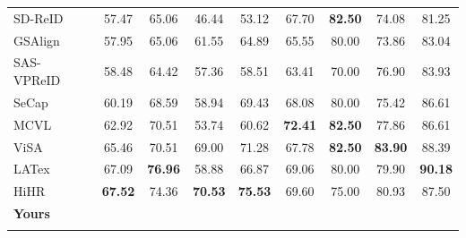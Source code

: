 \documentclass[runningheads]{llncs}
\makeatletter
\let\leaderboards@table\table
\let\leaderboards@endtable\endtable
\renewenvironment{table}[1][]{\leaderboards@table[H]}{\leaderboards@endtable}
\makeatother
\begin{document}
\begin{table}[t]
\begin{tabular}{lcccccccc}
    SD-ReID~\cite{wang2026sd}          & 57.47                               & 65.06                  & 46.44                   & 53.12                  & 67.70                   & \textbf{82.50}         & 74.08                   & 81.25                  \\
    GSAlign~\cite{li2026gsalign}       & 57.95                               & 65.06                  & 61.55                   & 64.89                  & 65.55                   & 80.00                  & 73.86                   & 83.04                  \\
    SAS-VPReID~\cite{yang2026sas}      & 58.48                               & 64.42                  & 57.36                   & 58.51                  & 63.41                   & 70.00                  & 76.90                   & 83.93                  \\
    SeCap~\cite{wang2025secap}         & 60.19                               & 68.59                  & 58.94                   & 69.43                  & 68.08                   & 80.00                  & 75.42                   & 86.61                  \\
    MCVL                               & 62.92                               & 70.51                  & 53.74                   & 60.62                  & \textbf{72.41}          & \textbf{82.50}         & 77.86                   & 86.61                  \\
    ViSA~\cite{zhang2026view}          & 65.46                               & 70.51                  & 69.00                   & 71.28                  & 67.78                   & \textbf{82.50}         & \textbf{83.90}          & 88.39                  \\
    LATex~\cite{zhang2025latex}        & 67.09                               & \textbf{76.96}         & 58.88                   & 66.87                  & 69.06                   & 80.00                  & 79.90                   & \textbf{90.18}         \\
    HiHR~\cite{yang2026hihr}           & \textbf{67.52}                      & 74.36                  & \textbf{70.53}          & \textbf{75.53}         & 69.60                   & 75.00                  & 80.93                   & 87.50                  \\
    \Xhline{0.6pt}
    \rowcolor{gray!15}
    \textbf{Yours}                     & \textbf{}                           & \textbf{}              & \textbf{}               & \textbf{}              & \textbf{}               & \textbf{}              & \textbf{}               & \textbf{}              \\
    \Xhline{1.0pt}
  \end{tabular}
\end{table}
\end{document}
